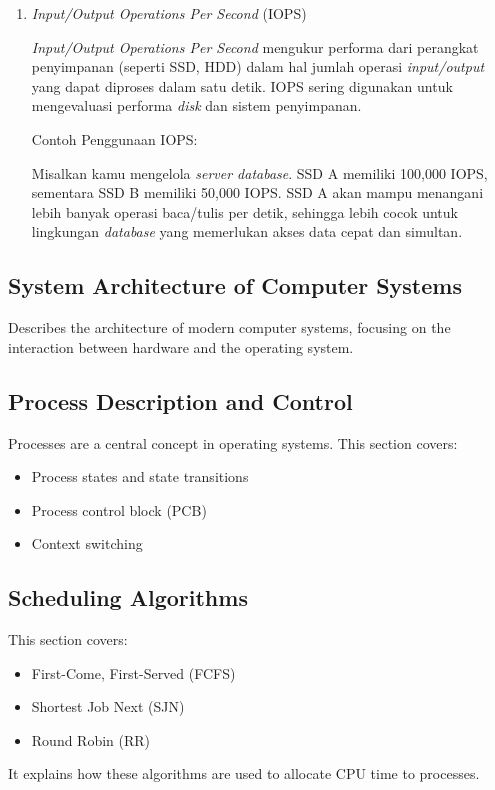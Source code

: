 \documentclass[12pt]{article}
\begin{document}
\begin{enumerate}
    \item \textit{Input/Output Operations Per Second} (IOPS)
    \par \textit{Input/Output Operations Per Second} mengukur performa dari perangkat penyimpanan (seperti SSD, HDD) dalam hal jumlah operasi \textit{input/output} yang dapat diproses dalam satu detik. IOPS sering digunakan untuk mengevaluasi performa \textit{disk} dan sistem penyimpanan.
    \par Contoh Penggunaan IOPS:
    \par Misalkan kamu mengelola \textit{server database}. SSD A memiliki 100,000 IOPS, sementara SSD B memiliki 50,000 IOPS. SSD A akan mampu menangani lebih banyak operasi baca/tulis per detik, sehingga lebih cocok untuk lingkungan \textit{database} yang memerlukan akses data cepat dan simultan.
    
\end{enumerate}


\subsection{System Architecture of Computer Systems}
Describes the architecture of modern computer systems, focusing on the interaction between hardware and the operating system.

\subsection{Process Description and Control}
Processes are a central concept in operating systems. This section covers:
\begin{itemize}
    \item Process states and state transitions
    \item Process control block (PCB)
    \item Context switching
\end{itemize}

\subsection{Scheduling Algorithms}
This section covers:
\begin{itemize}
    \item First-Come, First-Served (FCFS)
    \item Shortest Job Next (SJN)
    \item Round Robin (RR)
\end{itemize}
It explains how these algorithms are used to allocate CPU time to processes.
\end{document}
